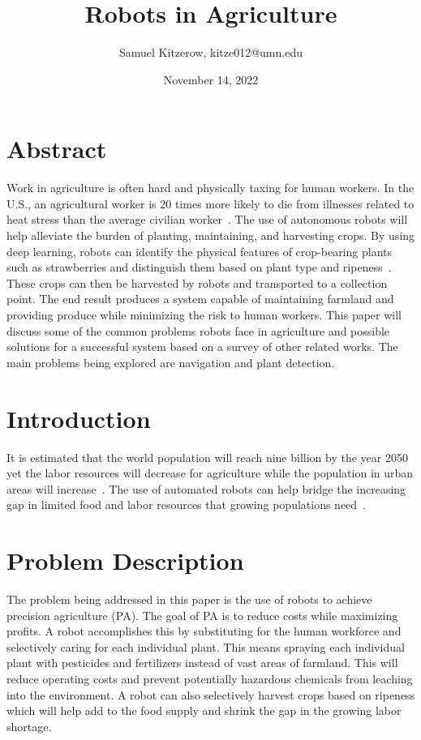 \documentclass[12pt]{article}
\title{Robots in Agriculture}
\author{Samuel Kitzerow, kitze012@umn.edu}
\date{November 14, 2022}
\begin{document}
\maketitle
\section*{Abstract}
Work in agriculture is often hard and physically taxing for human workers. In the U.S., an agricultural worker is 20 times more likely to die from illnesses related to heat stress than the average civilian worker~\cite{tigchelaar2020work}. The use of autonomous robots will help alleviate the burden of planting, maintaining, and harvesting crops. By using deep learning, robots can identify the physical features of crop-bearing plants such as strawberries and distinguish them based on plant type and ripeness~\cite{yu2019fruit}. These crops can then be harvested by robots and transported to a collection point. The end result produces a system capable of maintaining farmland and providing produce while minimizing the risk to human workers. This paper will discuss some of the common problems robots face in agriculture and possible solutions for a successful system based on a survey of other related works. The main problems being explored are navigation and plant detection.

\section{Introduction}
It is estimated that the world population will reach nine billion by the year 2050 yet the labor resources will decrease for agriculture while the population in urban areas will increase~\cite{9096177}. The use of automated robots can help bridge the increasing gap in limited food and labor resources that growing populations need~\cite{zhou2022intelligent}. 

\section{Problem Description}
The problem being addressed in this paper is the use of robots to achieve precision agriculture (PA). The goal of PA is to reduce costs while maximizing profits. A robot accomplishes this by substituting for the human workforce and selectively caring for each individual plant. This means spraying each individual plant with pesticides and fertilizers instead of vast areas of farmland. This will reduce operating costs and prevent potentially hazardous chemicals from leaching into the environment. A robot can also selectively harvest crops based on ripeness which will help add to the food supply and shrink the gap in the growing labor shortage.
\end{document}
